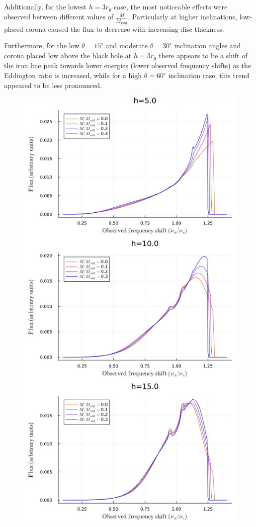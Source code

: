 \documentclass[fleqn,usenatbib,useAMS]{mnras}
\begin{document}
Additionally, for the lowest $h = 3 r_{g}$ case, the most noticeable effects were observed between different values of $\frac{\dot{M}}{\dot{M}_\text{Edd}}$. Particularly at higher inclinations, low-placed corona caused the flux to decrease with increasing disc thickness.

Furthermore, for the low $\theta = 15^{\circ}$ and moderate $\theta = 30^{\circ}$ inclination angles and corona placed low above the black hole at $h = 3 r_{g}$ there appears to be a shift of the iron line peak towards lower energies (lower observed frequency shifts) as the Eddington ratio is increased, while for a high $\theta = 60^{\circ}$ inclination case, this trend appeared to be less pronounced.

\begin{figure}
\includegraphics[width=\linewidth]{figures/johannsen_selfconsistent.png}

\end{figure}
\end{document}
